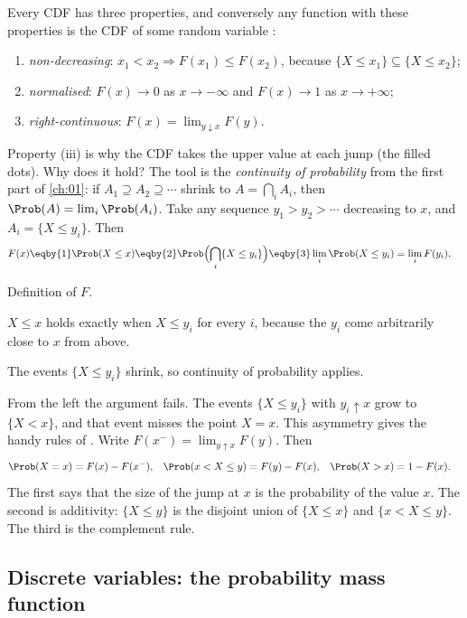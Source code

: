 Every CDF has three properties, and conversely any function with these
properties is the CDF of some random variable :
\begin{enumerate}[label=(\roman*),leftmargin=2em,itemsep=1pt]
  \item \emph{non-decreasing}: $x_1<x_2\Rightarrow F(x_1)\le F(x_2)$, because
        $\{X\le x_1\}\subseteq\{X\le x_2\}$;
  \item \emph{normalised}: $F(x)\to0$ as $x\to-\infty$ and $F(x)\to1$ as
        $x\to+\infty$;
  \item \emph{right-continuous}: $F(x)=\lim_{y\downarrow x}F(y)$.
\end{enumerate}
Property (iii) is why the CDF takes the upper value at each jump (the filled
dots). Why does it hold? The tool is the \emph{continuity of probability}
from the first part of \cref{ch:01}: if
$A_1\supseteq A_2\supseteq\cdots$ shrink to $A=\bigcap_iA_i$, then
$\Prob(A)=\lim_i\Prob(A_i)$. Take any sequence $y_1>y_2>\cdots$ decreasing to
$x$, and $A_i=\{X\le y_i\}$. Then
\begin{align*}
  F(x)
  &\eqby{1} \Prob(X\le x)
   \eqby{2} \Prob\Bigl(\bigcap_i\{X\le y_i\}\Bigr)
   \eqby{3} \lim_i\Prob(X\le y_i)
   = \lim_i F(y_i) .
\end{align*}
\begin{explain}
  \item Definition of $F$.
  \item $X\le x$ holds exactly when $X\le y_i$ for every $i$, because the
        $y_i$ come arbitrarily close to $x$ from above.
  \item The events $\{X\le y_i\}$ shrink, so continuity of probability applies.
\end{explain}
From the left the argument fails. The events $\{X\le y_i\}$ with $y_i\uparrow
x$ grow to $\{X<x\}$, and that event misses the point $X=x$. This asymmetry
gives the handy rules of . Write
$F(x^-)=\lim_{y\uparrow x}F(y)$. Then
\begin{align}
  \Prob(X=x)&=F(x)-F(x^-), &
  \Prob(x<X\le y)&=F(y)-F(x), &
  \Prob(X>x)&=1-F(x). \label{1b:eq:cdf-rules}
\end{align}
The first says that the size of the jump at $x$ is the probability of the
value $x$. The second is additivity: $\{X\le y\}$ is the disjoint union of
$\{X\le x\}$ and $\{x<X\le y\}$. The third is the complement rule.

\subsection{Discrete variables: the probability mass function}

